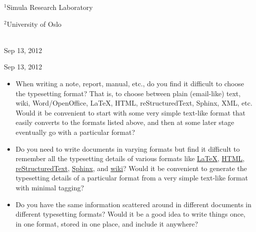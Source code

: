 \documentclass[twoside]{book}
\begin{document}
\begin{center}
\begin{center}
\centerline{{\small ${}^1$Simula Research Laboratory}}
\centerline{{\small ${}^2$University of Oslo}}
\end{center}





\date{Sep 13, 2012}
\maketitle


\ \\ [10mm]
{\large\textsf{Sep 13, 2012}}

\end{center}
\vfill
\clearpage


\begin{center}
Sep 13, 2012
\end{center}

\vspace{1cm}



\begin{itemize}
 \item When writing a note, report, manual, etc., do you find it difficult
   to choose the typesetting format? That is, to choose between plain
   (email-like) text, wiki, Word/OpenOffice, {\LaTeX}, HTML,
   reStructuredText, Sphinx, XML, etc.  Would it be convenient to
   start with some very simple text-like format that easily converts
   to the formats listed above, and then at some later stage
   eventually go with a particular format?

 \item Do you need to write documents in varying formats but find it
   difficult to remember all the typesetting details of various
   formats like \href{{http://refcards.com/docs/silvermanj/amslatex/LaTeXRefCard.v2.0.pdf}}{LaTeX}, \href{{http://www.htmlcodetutorial.com/}}{HTML}, \href{{http://docutils.sourceforge.net/docs/ref/rst/restructuredtext.html}}{reStructuredText}, \href{{http://sphinx.pocoo.org/contents.html}}{Sphinx}, and \href{{http://code.google.com/p/support/wiki/WikiSyntax}}{wiki}? Would it be convenient
   to generate the typesetting details of a particular format from a
   very simple text-like format with minimal tagging?

 \item Do you have the same information scattered around in different
   documents in different typesetting formats? Would it be a good idea
   to write things once, in one format, stored in one place, and
   include it anywhere?
\end{itemize}
\end{document}
